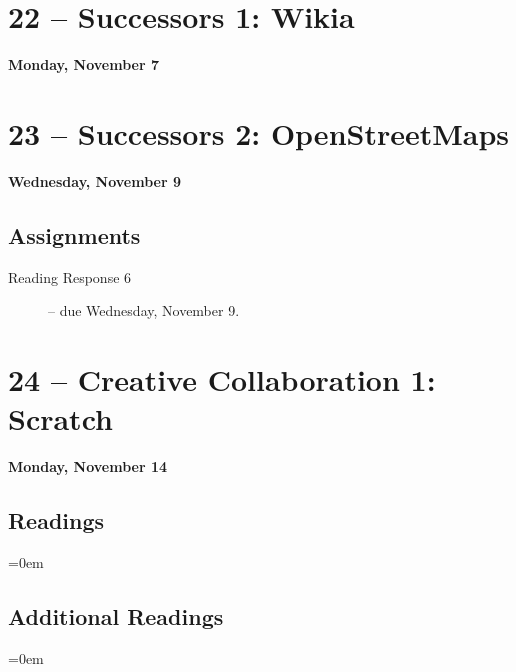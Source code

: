 \documentclass[11pt]{memoir}
\newenvironment{readinglist}{
\begin{list}{}{\leftmargin=8pt \itemindent=0em}
  \setlength{\itemsep}{8pt}
  \setlength{\parskip}{0em}
  \setlength{\parsep}{1em}
  \setlength{\parindent}{8em}}
{\end{list}}
\begin{document}
\section{22 -- Successors 1: Wikia}
\textcolor{CUGold}{\textbf{Monday, November 7}}

\section{23 -- Successors 2: OpenStreetMaps}
\textcolor{CUGold}{\textbf{Wednesday, November 9}}

    
    \subsection{Assignments}
    \begin{description}%
        \item[Reading Response 6 ] -- due Wednesday, November 9. 
    \end{description}
    
\section{24 -- Creative Collaboration 1: Scratch}
\textcolor{CUGold}{\textbf{Monday, November 14}}

    \subsection{Readings}
    \begin{readinglist}
        \item {}
        \item {}
    \end{readinglist}
    
    \subsection{Additional Readings}
    \begin{readinglist}
        \item {}
        \item {}
        \item {}
        \item {}
    \end{readinglist}
\end{document}
